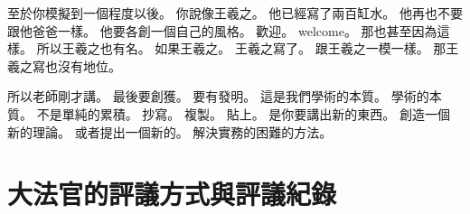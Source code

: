 \hypertarget{w01:cue:1675}{}至於你模擬到一個程度以後。
\hypertarget{w01:cue:1676}{}你說像王羲之。
\hypertarget{w01:cue:1677}{}他已經寫了兩百缸水。
\hypertarget{w01:cue:1678}{}他再也不要跟他爸爸一樣。
\hypertarget{w01:cue:1679}{}他要各創一個自己的風格。
\hypertarget{w01:cue:1680}{}歡迎。
\hypertarget{w01:cue:1681}{}welcome。
\hypertarget{w01:cue:1682}{}那也甚至因為這樣。
\hypertarget{w01:cue:1683}{}所以王羲之也有名。
\hypertarget{w01:cue:1684}{}如果王羲之。
\hypertarget{w01:cue:1685}{}王羲之寫了。
\hypertarget{w01:cue:1686}{}跟王羲之一模一樣。
\hypertarget{w01:cue:1687}{}那王羲之寫也沒有地位。

\hypertarget{w01:cue:1688}{}所以老師剛才講。
\hypertarget{w01:cue:1689}{}最後要創獲。
\hypertarget{w01:cue:1690}{}要有發明。
\hypertarget{w01:cue:1691}{}這是我們學術的本質。
\hypertarget{w01:cue:1692}{}學術的本質。
\hypertarget{w01:cue:1693}{}不是單純的累積。
\hypertarget{w01:cue:1694}{}抄寫。
\hypertarget{w01:cue:1695}{}複製。
\hypertarget{w01:cue:1696}{}貼上。
\hypertarget{w01:cue:1697}{}是你要講出新的東西。
\hypertarget{w01:cue:1698}{}創造一個新的理論。
\hypertarget{w01:cue:1699}{}或者提出一個新的。
\hypertarget{w01:cue:1700}{}解決實務的困難的方法。

\section{大法官的評議方式與評議紀錄}

